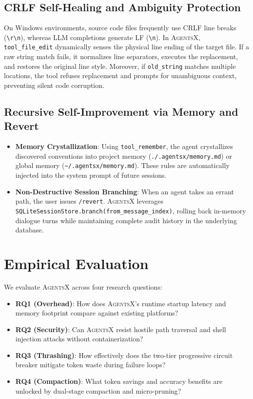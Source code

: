 \documentclass[10pt,twocolumn,letterpaper]{article}
\begin{document}
\subsection{CRLF Self-Healing and Ambiguity Protection}
On Windows environments, source code files frequently use CRLF line breaks (\texttt{\textbackslash r\textbackslash n}), whereas LLM completions generate LF (\texttt{\textbackslash n}). In \textsc{AgentsX}, \texttt{tool\_file\_edit} dynamically senses the physical line ending of the target file. If a raw string match fails, it normalizes line separators, executes the replacement, and restores the original line style. Moreover, if \texttt{old\_string} matches multiple locations, the tool refuses replacement and prompts for unambiguous context, preventing silent code corruption.

\subsection{Recursive Self-Improvement via Memory and Revert}
\begin{itemize}
    \item \textbf{Memory Crystallization}: Using \texttt{tool\_remember}, the agent crystallizes discovered conventions into project memory (\texttt{./.agentsx/memory.md}) or global memory (\texttt{\textasciitilde/.agentsx/memory.md}). These rules are automatically injected into the system prompt of future sessions.
    \item \textbf{Non-Destructive Session Branching}: When an agent takes an errant path, the user issues \texttt{/revert}. \textsc{AgentsX} leverages \texttt{SQLiteSessionStore.branch(from\_message\_index)}, rolling back in-memory dialogue turns while maintaining complete audit history in the underlying database.
\end{itemize}

\section{Empirical Evaluation}
\label{sec:eval}

We evaluate \textsc{AgentsX} across four research questions:
\begin{itemize}
    \item \textbf{RQ1 (Overhead)}: How does \textsc{AgentsX}'s runtime startup latency and memory footprint compare against existing platforms?
    \item \textbf{RQ2 (Security)}: Can \textsc{AgentsX} resist hostile path traversal and shell injection attacks without containerization?
    \item \textbf{RQ3 (Thrashing)}: How effectively does the two-tier progressive circuit breaker mitigate token waste during failure loops?
    \item \textbf{RQ4 (Compaction)}: What token savings and accuracy benefits are unlocked by dual-stage compaction and micro-pruning?
\end{itemize}
\end{document}

